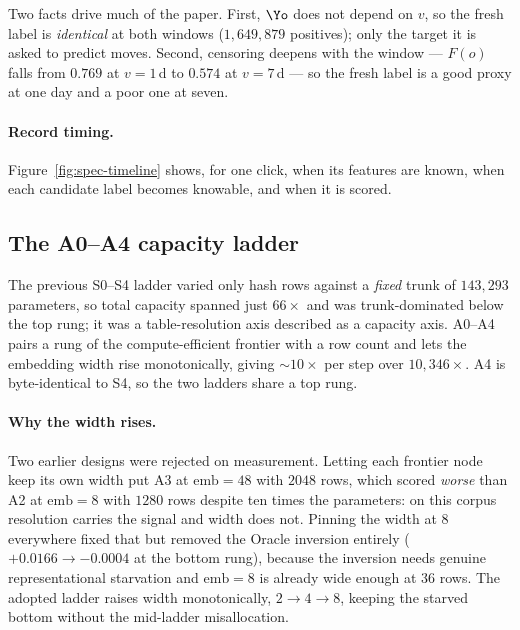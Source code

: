 Two facts drive much of the paper. First, $\Yo$ does not depend on $v$, so the fresh label is
\emph{identical} at both windows ($1{,}649{,}879$ positives); only the target it is asked to
predict moves. Second, censoring deepens with the window --- $F(o)$ falls from $0.769$ at $v=1$\,d
to $0.574$ at $v=7$\,d --- so the fresh label is a good proxy at one day and a poor one at seven.

\paragraph{Record timing.} Figure~\ref{fig:spec-timeline} shows, for one click, when its features
are known, when each candidate label becomes knowable, and when it is scored.



\subsection{The A0--A4 capacity ladder}\label{app:ladder}

The previous S0--S4 ladder varied only hash rows against a \emph{fixed} trunk of $143{,}293$
parameters, so total capacity spanned just $66\times$ and was trunk-dominated below the top rung;
it was a table-resolution axis described as a capacity axis. A0--A4 pairs a rung of the
compute-efficient frontier with a row count and lets the embedding width rise monotonically,
giving $\sim\!10\times$ per step over $10{,}346\times$. A4 is byte-identical to S4, so the two
ladders share a top rung.

\begin{table}[h]
\caption{The A0--A4 ladder, introspected from the instantiated models. The trunk grows with the
tables, and embedding width rises monotonically $2\to4\to8$}
\label{tab:spec-ladder}
\centering\small

\end{table}

\paragraph{Why the width rises.} Two earlier designs were rejected on measurement. Letting each
frontier node keep its own width put A3 at $\text{emb}=48$ with $2048$ rows, which scored
\emph{worse} than A2 at $\text{emb}=8$ with $1280$ rows despite ten times the parameters: on this
corpus resolution carries the signal and width does not. Pinning the width at $8$ everywhere fixed
that but removed the Oracle inversion entirely ($+0.0166 \to -0.0004$ at the bottom rung), because
the inversion needs genuine representational starvation and $\text{emb}=8$ is already wide enough
at $36$ rows. The adopted ladder raises width monotonically, $2\to4\to8$, keeping the starved
bottom without the mid-ladder misallocation.

